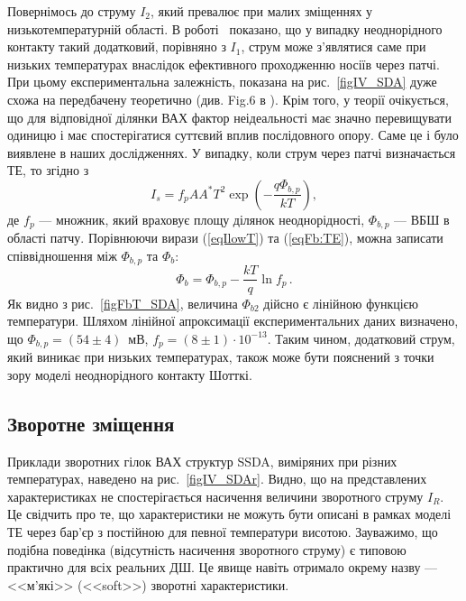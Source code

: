 Повернімось до струму $I_2$, який превалює при малих зміщеннях у низькотемпературній області.
В роботі~\cite{Tung:PhysRev} показано, що у випадку неоднорідного контакту такий додатковий, порівняно з $I_1$, струм
може з'являтися саме при низьких температурах внаслідок ефективного проходженню носіїв через патчі.
При цьому експериментальна залежність, показана на рис.~\ref{figIV_SDA} дуже схожа на передбачену теоретично (див. Fig.6 в \cite{Tung:PhysRev}).
Крім того, у теорії очікується, що для відповідної ділянки ВАХ фактор неідеальності має значно перевищувати одиницю
і має спостерігатися суттєвий вплив послідовного опору.
Саме це і було виявлене в наших дослідженнях.
У випадку, коли струм через патчі визначається ТЕ, то згідно з \cite{Sarpatwari, Tung:PhysRev}
\begin{equation}\label{eqIlowT}
I_s=f_pAA^*T^2\exp\left(-\frac{q\Phi_{b,p}}{kT}\right),
\end{equation}
де
$f_p$  --- множник, який враховує площу ділянок неоднорідності,
$\Phi_{b,p}$ --- ВБШ в області патчу.
Порівнюючи вирази (\ref{eqIlowT}) та (\ref{eqFb:TE}), можна
записати співвідношення між $\Phi_{b,p}$ та $\Phi_{b}$:
\begin{equation}\label{eqFbFbp}
\Phi_b=\Phi_{b,p}-\frac{kT}{q}\ln{f_p}\,.
\end{equation}
Як видно з рис.~\ref{figFbT_SDA}, величина $\Phi_{b2}$ дійсно є лінійною функцією температури.
Шляхом лінійної апроксимації експериментальних даних визначено, що $\Phi_{b,p}=(54\pm4)$~мВ,
$f_p=(8\pm1)\cdot10^{-13}$.
Таким чином, додатковий струм, який виникає при низьких температурах, також може бути пояснений з точки
зору моделі неоднорідного контакту Шотткі.

\subsection{Зворотне зміщення}

Приклади зворотних гілок ВАХ структур SSDA, виміряних при різних температурах, наведено на рис.~\ref{figIV_SDAr}.
Видно, що на представлених характеристиках не спостерігається насичення величини зворотного струму $I_R$.
Це свідчить про те,
що характеристики не можуть бути описані в рамках моделі ТЕ через бар'єр з постійною для певної температури висотою.
Зауважимо, що подібна поведінка (відсутність насичення зворотного струму) є типовою
практично для всіх реальних ДШ.
Це явище навіть отримало окрему назву --- <<м'які>> (<<soft>>) зворотні характеристики.

